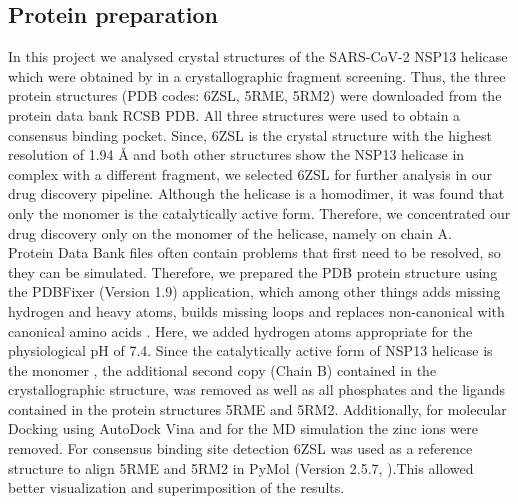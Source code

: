 \documentclass[11pt, letterpaper, titlepage]{article}
\renewcommand{\cite}{\parencite}
\begin{document}
\subsection{Protein preparation}
In this project we analysed crystal structures of the SARS-CoV-2 NSP13 helicase which were obtained by \cite{Newman_2021} in a crystallographic fragment screening. Thus, the three protein structures (PDB codes: 6ZSL, 5RME, 5RM2) were downloaded from the protein data bank RCSB PDB. All three structures were used to obtain a consensus binding pocket. Since, 6ZSL is the crystal structure with the highest resolution of 1.94 {\AA} and both other structures show the NSP13 helicase in complex with a different fragment, we selected 6ZSL for further analysis in our drug discovery pipeline. Although the helicase is a homodimer, it was found that only the monomer is the catalytically active form. Therefore, we concentrated our drug discovery only on the monomer of the helicase, namely on chain A. \\
Protein Data Bank files often contain problems that first need to be resolved, so they can be simulated. Therefore, we prepared the PDB protein structure using the PDBFixer (Version 1.9) application, which among other things adds missing hydrogen and heavy atoms, builds missing loops and replaces non-canonical with canonical amino acids \cite{Eastman_2017}. Here, we added hydrogen atoms appropriate for the physiological pH of 7.4. Since the catalytically active form of NSP13 helicase is the monomer \cite{Berta_2021}, the additional second copy (Chain B) contained in the crystallographic structure, was removed as well as all phosphates and the ligands contained in the protein structures 5RME and 5RM2. Additionally, for molecular Docking using AutoDock Vina and for the \ac{MD} simulation the zinc ions were removed. 
For consensus binding site detection 6ZSL was used as a reference structure to align 5RME and 5RM2 in PyMol (Version 2.5.7, \textcite{PyMol_endnote}).This allowed better visualization and superimposition of the results.
\end{document}
